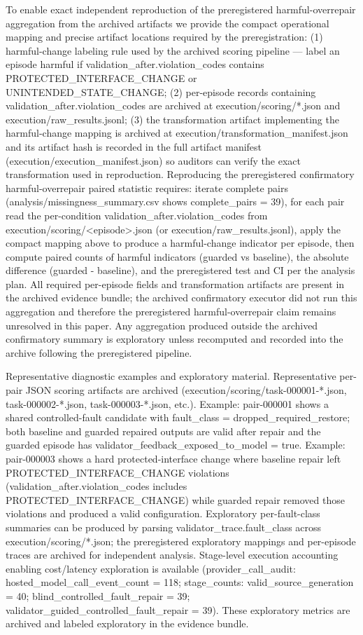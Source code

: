 \documentclass[conference]{IEEEtran}
\begin{document}
To enable exact independent reproduction of the preregistered harmful-overrepair aggregation from the archived artifacts we provide the compact operational mapping and precise artifact locations required by the preregistration: (1) harmful-change labeling rule used by the archived scoring pipeline --- label an episode harmful if validation\_after.violation\_codes contains PROTECTED\_INTERFACE\_CHANGE or UNINTENDED\_STATE\_CHANGE; (2) per-episode records containing validation\_after.violation\_codes are archived at execution/scoring/*.json and execution/raw\_results.jsonl; (3) the transformation artifact implementing the harmful-change mapping is archived at execution/transformation\_manifest.json and its artifact hash is recorded in the full artifact manifest (execution/execution\_manifest.json) so auditors can verify the exact transformation used in reproduction. Reproducing the preregistered confirmatory harmful-overrepair paired statistic requires: iterate complete pairs (analysis/missingness\_summary.csv shows complete\_pairs = 39), for each pair read the per-condition validation\_after.violation\_codes from execution/scoring/<episode>.json (or execution/raw\_results.jsonl), apply the compact mapping above to produce a harmful-change indicator per episode, then compute paired counts of harmful indicators (guarded vs baseline), the absolute difference (guarded - baseline), and the preregistered test and CI per the analysis plan. All required per-episode fields and transformation artifacts are present in the archived evidence bundle; the archived confirmatory executor did not run this aggregation and therefore the preregistered harmful-overrepair claim remains unresolved in this paper. Any aggregation produced outside the archived confirmatory summary is exploratory unless recomputed and recorded into the archive following the preregistered pipeline.

Representative diagnostic examples and exploratory material. Representative per-pair JSON scoring artifacts are archived (execution/scoring/task-000001-*.json, task-000002-*.json, task-000003-*.json, etc.). Example: pair-000001 shows a shared controlled-fault candidate with fault\_class = dropped\_required\_restore; both baseline and guarded repaired outputs are valid after repair and the guarded episode has validator\_feedback\_exposed\_to\_model = true. Example: pair-000003 shows a hard protected-interface change where baseline repair left PROTECTED\_INTERFACE\_CHANGE violations (validation\_after.violation\_codes includes PROTECTED\_INTERFACE\_CHANGE) while guarded repair removed those violations and produced a valid configuration. Exploratory per-fault-class summaries can be produced by parsing validator\_trace.fault\_class across execution/scoring/*.json; the preregistered exploratory mappings and per-episode traces are archived for independent analysis. Stage-level execution accounting enabling cost/latency exploration is available (provider\_call\_audit: hosted\_model\_call\_event\_count = 118; stage\_counts: valid\_source\_generation = 40; blind\_controlled\_fault\_repair = 39; validator\_guided\_controlled\_fault\_repair = 39). These exploratory metrics are archived and labeled exploratory in the evidence bundle.
\end{document}
